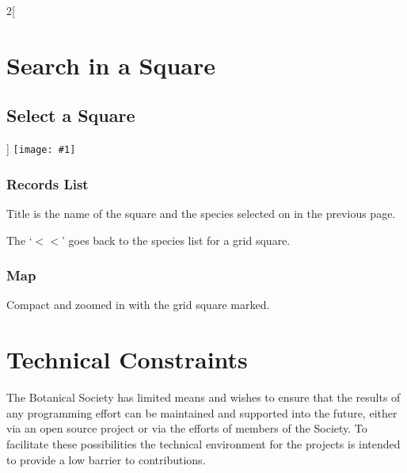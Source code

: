 \documentclass[a4paper,12pt,landscape]{article}
\newcommand{\wireframe}[1]{\texttt{[image: \#1]}\clearpage}
\begin{document}
\begin{multicols*}{2}[%
  \section{Search in a Square}%
  \subsection{Select a Square}%
]
\wireframe{./wireframes/Records__SingleSpeciesForSquare.png}%

\subsubsection*{Records List}

\begin{todolist}
  \item Title is the name of the square and the species selected on in the previous page.
  \item The `$<<$' goes back to the species list for a grid square.
\end{todolist}

\subsubsection*{Map}

\begin{todolist}
  \item Compact and zoomed in with the grid square marked.
\end{todolist}

\clearpage

\end{multicols*}

\section{Technical Constraints}%


The Botanical Society has limited means
and wishes to ensure that the results of any programming effort
can be maintained and supported
into the future,
either via an open source project or via the efforts of members of the Society.
To facilitate these possibilities
the technical environment for the projects is intended 
to provide a low barrier to contributions.
\end{document}
